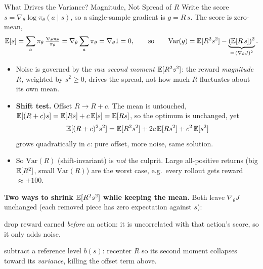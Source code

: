 \begin{frame}{What Drives the Variance? Magnitude, Not Spread of $R$}
  Write the score $s = \nabla_\theta\log\pi_\theta(a\mid s)$, so a single-sample gradient is $g = R\,s$. The score is zero-mean,
  \[
    \mathbb{E}[s]=\sum_a \pi_\theta\,\tfrac{\nabla_\theta\pi_\theta}{\pi_\theta}=\nabla_\theta\sum_a\pi_\theta=\nabla_\theta 1 = 0,
    \qquad\text{so}\qquad
    \mathrm{Var}(g) = \mathbb{E}[R^2 s^2] - \underbrace{(\mathbb{E}[R\,s])^2}_{=\,(\nabla_\theta J)^2}.
  \]
  \begin{itemize}[nosep]
    \item Noise is governed by the \emph{raw second moment} $\mathbb{E}[R^2 s^2]$: the reward \emph{magnitude} $R$, weighted by $s^2\ge 0$, drives the spread, not how much $R$ fluctuates about its own mean.
    \item \textbf{Shift test.} Offset $R\to R+c$. The mean is untouched, $\mathbb{E}[(R+c)s]=\mathbb{E}[Rs]+c\,\mathbb{E}[s]=\mathbb{E}[Rs]$, so the optimum is unchanged, yet
      \[
        \mathbb{E}[(R+c)^2 s^2] = \mathbb{E}[R^2 s^2] + 2c\,\mathbb{E}[R s^2] + c^2\,\mathbb{E}[s^2]
      \]
      grows quadratically in $c$: pure offset, more noise, same solution.
    \item So $\mathrm{Var}(R)$ (shift-invariant) is \emph{not} the culprit. Large all-positive returns (big $\mathbb{E}[R^2]$, small $\mathrm{Var}(R)$) are the worst case, e.g.\ every rollout gets reward $\approx +100$.
  \end{itemize}

  \vspace{0.4em}
  \textbf{Two ways to shrink $\mathbb{E}[R^2 s^2]$ while keeping the mean.} Both leave $\nabla_\theta J$ unchanged (each removed piece has zero expectation against $s$):
  \begin{description}[nosep,leftmargin=!,labelwidth=\widthof{\textbf{Baseline}}]
    \item[\textbf{Reward-to-go}] drop reward earned \emph{before} an action: it is uncorrelated with that action's score, so it only adds noise.
    \item[\textbf{Baseline}] subtract a reference level $b(s)$: recenter $R$ so its second moment collapses toward its \emph{variance}, killing the offset term above.
  \end{description}
\end{frame}

